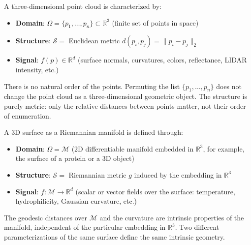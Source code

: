 \begin{example}\label{ex:nube_puntos}
A three-dimensional point cloud is characterized by:
\begin{itemize}
	\item \textbf{Domain}: $\Omega = \{p_1, \ldots, p_n\} \subset \mathbb{R}^3$ (finite set of points in space)
	\item \textbf{Structure}: $\mathcal{S} = $ Euclidean metric $d(p_i, p_j) = \|p_i - p_j\|_2$
	\item \textbf{Signal}: $f(p) \in \mathbb{R}^d$ (surface normals, curvatures, colors, reflectance, LIDAR intensity, etc.)
\end{itemize}

There is no natural order of the points. Permuting the list $\{p_1,\ldots,p_n\}$ does not change the point cloud as a three-dimensional geometric object. The structure is purely metric: only the relative distances between points matter, not their order of enumeration.
\end{example}

\begin{example}\label{ex:superficie_riemanniana}
A 3D surface as a Riemannian manifold is defined through:
\begin{itemize}
	\item \textbf{Domain}: $\Omega = \mathcal{M}$ (2D differentiable manifold embedded in $\mathbb{R}^3$, for example, the surface of a protein or a 3D object)
	\item \textbf{Structure}: $\mathcal{S} = $ Riemannian metric $g$ induced by the embedding in $\mathbb{R}^3$
	\item \textbf{Signal}: $f: \mathcal{M} \to \mathbb{R}^d$ (scalar or vector fields over the surface: temperature, hydrophilicity, Gaussian curvature, etc.)
\end{itemize}

The geodesic distances over $\mathcal{M}$ and the curvature are intrinsic properties of the manifold, independent of the particular embedding in $\mathbb{R}^3$. Two different parameterizations of the same surface define the same intrinsic geometry.
\end{example}


